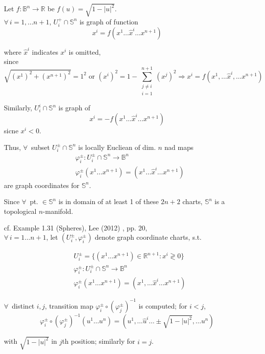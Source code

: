\documentclass[10pt]{amsart}
\begin{document}
\begin{multicols*}{2}
Let $f: \mathbb{B}^n \to \mathbb{R}$ be $f(u) = \sqrt{ 1 - |u|^2}$. \\

$\forall \, i =1 , \dots n +1$, $U_i^+ \cap \mathbb{S}^n$ is graph of function
\[
x^i = f(x^1 \dots \widehat{x}^i \dots x^{n+1})
\]

where $\widehat{x}^i$ indicates $x^i$ is omitted, \\
since
\[
\sqrt{ (x^1)^2  + (x^{n+1})^2 } = 1^2 \text{ or } (x^i)^2 = 1 - \sum_{ \substack{ j\neq i \\ i =1} }^{n+1} (x^j)^2 \Longrightarrow x^i = f(x^1, \dots \widehat{x}^i, \dots x^{n+1})
\]

Similarly, $U_i^i \cap \mathbb{S}^n$ is graph of 
\[
x^i = -f(x^1 \dots \widehat{x}^i \dots x^{n+1})
\]
sicne $x^i < 0$.

Thus, $\forall \,$ subset $U_i^{\pm} \cap \mathbb{S}^n$ is locally Eucliean of dim. $n$ nad maps
\[
\begin{aligned}
	& \varphi_i^{\pm} : U_i^{\pm} \cap \mathbb{S}^n \to \mathbb{B}^n \\
	& \varphi_i^{\pm} (x^1 \dots x^{n+1}) = (x^1 \dots \widehat{x}^i \dots x^{n+1})
\end{aligned}
\]
are graph coordinates for $\mathbb{S}^n$.

Since $\forall \,$ pt. $\in \mathbb{S}^n$ is in domain of at least 1 of these $2n+2$ charts, $\mathbb{S}^n$ is a topological $n$-manifold.

cf. Example 1.31 (Spheres), Lee (2012) \cite{JLee2012}, pp. 20, \\

$\forall \, i = 1 \dots n+1$, let $(U_i^{\pm}, \varphi_i^{\pm})$ denote graph coordinate charts, s.t.

\[
\begin{aligned}
	& U_i^{\pm} = \lbrace (x^1 \dots x^{n+1}) \in \mathbb{R}^{n+1} : x^i \gtrless 0 \rbrace \\ 
	& \varphi_i^{\pm} : U_i^{\pm} \cap \mathbb{S}^n \to \mathbb{B}^n \\ 
	& \varphi_i^{\pm} (x^1 \dots x^{n+1}) = (x^1, \dots \widehat{x}^i \dots x^{n+1})
\end{aligned}\]

$\forall \, $ distinct $i,j$, transition map $\varphi_i^{\pm} \circ (\varphi_j^{\pm})^{-1}$ is computed; for $i<j$,
\[
\varphi_i^{\pm} \circ (\varphi_j^{\pm})^{-1} (u^1 \dots u^n) = (u^1, \dots \widehat{u}^i \dots \pm \sqrt{1 - |u|^2}, \dots u^n )
\]

with $\sqrt{1- |u|^2}$ in $j$th position; similarly for $i =j$. \\


\end{multicols*}
\end{document}

